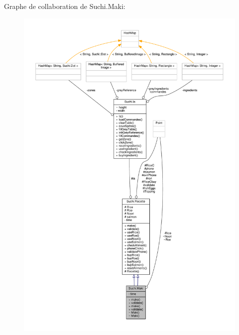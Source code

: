 Graphe de collaboration de Suchi.\+Maki\+:\nopagebreak
\begin{figure}[H]
\begin{center}
\leavevmode
\includegraphics[width=350pt]{classSuchi_1_1Maki__coll__graph}
\end{center}
\end{figure}
